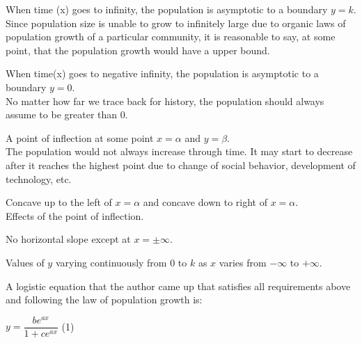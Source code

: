\documentclass[a4paper]{article}
\begin{document}
\begin{myitems}
\item When time (x) goes to infinity, the population is asymptotic to a boundary $y=k$. \\

Since population size is unable to grow to infinitely large due to organic laws of population growth of a particular community, it is reasonable to say, at some point, that the population growth would have a upper bound.\\

\item When time(x) goes to negative infinity, the population is asymptotic to a boundary $y=0$. \\

No matter how far we trace back for history, the population should always assume to be greater than 0.\\

\item A point of inflection at some point $x = \alpha$ and $y = \beta$. \\

The population would not always increase through time. It may start to decrease after it reaches the highest point due to change of social behavior, development of technology, etc.\\

\item Concave up to the left of $x = \alpha$ and concave down to right of $x = \alpha$. \\

Effects of the point of inflection.\\

\item No horizontal slope except at $x = \pm \infty$. \\

\item Values of $y$ varying continuously from 0 to $k$ as $x$ varies from $-\infty$ to $+\infty$.\\

\end{myitems}

A logistic equation that the author came up that satisfies all requirements above and following the law of population growth is: \

\begin{center}

\hspace{1cm} $y = \dfrac{be^{ax}}{1+ce^{ax}}$      \hspace{0.5cm}      (1)

\end{center}
\end{document}
